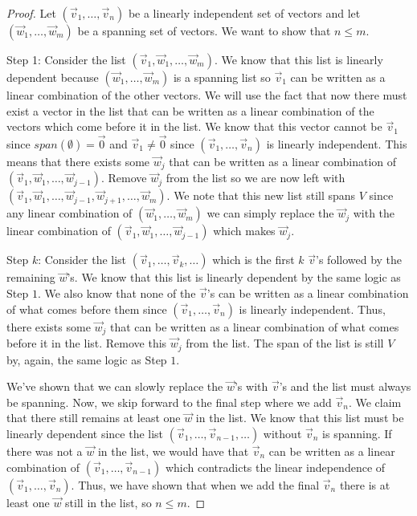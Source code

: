 \begin{proof}
    Let $(\vec{v}_1,\ldots,\vec{v}_n)$ be a linearly independent set of vectors and let $(\vec{w}_1,\ldots,\vec{w}_m)$ be a spanning set of vectors. We want to show that $n\leq m$.

    Step 1: Consider the list $(\vec{v}_1,\vec{w}_1,\ldots,\vec{w}_m)$. We know that this list is linearly dependent because $(\vec{w}_1,\ldots,\vec{w}_m)$ is a spanning list so $\vec{v}_1$ can be written as a linear combination of the other vectors. We will use the fact that now there must exist a vector in the list that can be written as a linear combination of the vectors which come before it in the list. We know that this vector cannot be $\vec{v}_1$ since $span(\emptyset)=\vec{0}$ and $\vec{v}_1\neq\vec{0}$ since $(\vec{v}_1,\ldots,\vec{v}_n)$ is linearly independent. This means that there exists some $\vec{w}_j$ that can be written as a linear combination of $(\vec{v}_1,\vec{w}_1,\ldots,\vec{w}_{j-1})$. Remove $\vec{w}_j$ from the list so we are now left with $(\vec{v}_1,\vec{w}_1,\ldots,\vec{w}_{j-1},\vec{w}_{j+1},\ldots,\vec{w}_m)$. We note that this new list still spans $V$ since any linear combination of $(\vec{w}_1,\ldots,\vec{w}_m)$ we can simply replace the $\vec{w}_j$ with the linear combination of $(\vec{v}_1,\vec{w}_1,\ldots,\vec{w}_{j-1})$ which makes $\vec{w}_j$.

    Step $k$: Consider the list $(\vec{v}_1,\ldots,\vec{v}_k,\ldots)$ which is the first $k$ $\vec{v}$'s followed by the remaining $\vec{w}$'s. We know that this list is linearly dependent by the same logic as Step $1$. We also know that none of the $\vec{v}$'s can be written as a linear combination of what comes before them since $(\vec{v}_1,\ldots,\vec{v}_n)$ is linearly independent. Thus, there exists some $\vec{w}_j$ that can be written as a linear combination of what comes before it in the list. Remove this $\vec{w}_j$ from the list. The span of the list is still $V$ by, again, the same logic as Step $1$.

    We've shown that we can slowly replace the $\vec{w}$'s with $\vec{v}$'s and the list must always be spanning. Now, we skip forward to the final step where we add $\vec{v}_n$. We claim that there still remains at least one $\vec{w}$ in the list. We know that this list must be linearly dependent since the list $(\vec{v}_1,\ldots,\vec{v}_{n-1},\ldots)$ without $\vec{v}_n$ is spanning. If there was not a $\vec{w}$ in the list, we would have that $\vec{v}_n$ can be written as a linear combination of $(\vec{v}_1,\ldots,\vec{v}_{n-1})$ which contradicts the linear independence of $(\vec{v}_1,\ldots,\vec{v}_{n})$. Thus, we have shown that when we add the final $\vec{v}_n$ there is at least one $\vec{w}$ still in the list, so $n\leq m$.
\end{proof}
